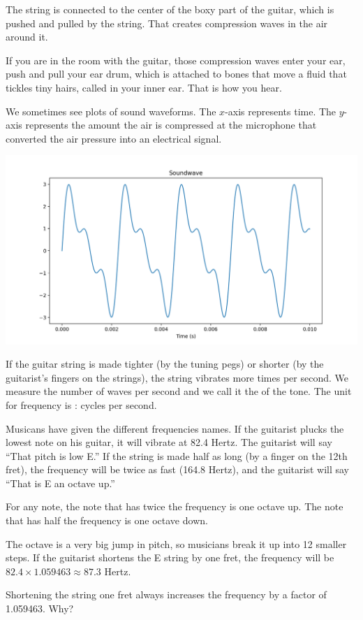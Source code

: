 The string is connected to the center of the boxy part of the guitar,
which is pushed and pulled by the string. That creates compression
waves in the air around it.

If you are in the room with the guitar, those compression waves enter
your ear, push and pull your ear drum, which is attached to bones that
move a fluid that tickles tiny hairs, called  in your
inner ear. That is how you hear.

We sometimes see plots of sound waveforms.  The $x$-axis represents
time. The $y$-axis represents the amount the air is compressed at the
microphone that converted the air pressure into an electrical signal.

\includegraphics[width=0.8\linewidth]{soundwave.png}

If the guitar string is made tighter (by the tuning pegs) or shorter
(by the guitarist's fingers on the strings), the string vibrates more
times per second.  We measure the number of waves per second and we
call it the  of the tone. The unit for frequency is
: cycles per second.

Musicans have given the different frequencies names. If the guitarist
plucks the lowest note on his guitar, it will vibrate at 82.4
Hertz. The guitarist will say ``That pitch is low E.'' If the string is made
half as long (by a finger on the 12th fret), the frequency will be
twice as fast (164.8 Hertz), and the guitarist will say ``That is E an
octave up.''

For any note, the note that has twice the frequency is one octave
up. The note that has half the frequency is one octave down.

The octave is a very big jump in pitch, so musicians break it up into
12 smaller steps. If the guitarist shortens the E string by one fret,
the frequency will be $82.4 \times 1.059463 \approx 87.3$ Hertz. 

Shortening the string one fret always increases the frequency by a factor of 1.059463. Why?

